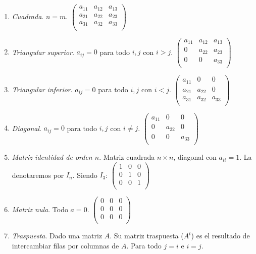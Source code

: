 \documentclass[11pt, oneside, titlepage]{article}
\begin{document}
\begin{enumerate}
\item \emph{Cuadrada}. $n=m$.
$\begin{pmatrix}
	a_{11} & a_{12} & a_{13}\\
	a_{21} & a_{22} & a_{23}\\
	a_{31} & a_{32} & a_{33}\\
\end{pmatrix}$
\item \emph{Triangular superior}. $a_{ij}=0$ para todo $i,j$ con $i > j$.
$\begin{pmatrix}
	a_{11} & a_{12} & a_{13}\\
	0 & a_{22} & a_{23}\\
	0 & 0 & a_{33}\\
\end{pmatrix}$
\item \emph{Triangular inferior}. $a_{ij}=0$ para todo $i,j$ con $i < j$.
$\begin{pmatrix}
	a_{11} & 0 & 0\\
	a_{21} & a_{22} & 0\\
	a_{31} & a_{32} & a_{33}\\
\end{pmatrix}$
\item \emph{Diagonal}. $a_{ij} = 0$ para todo $i,j$ con $i \neq j$.
$\begin{pmatrix}
	a_{11} & 0 & 0\\
	0 & a_{22} & 0\\
	0 & 0 & a_{33}\\
\end{pmatrix}$
\item \emph{Matriz identidad de orden $n$}. Matriz cuadrada $n \times n$, diagonal con $a_{ii} = 1$. La denotaremos por $I_n$. Siendo $I_3$:
$\begin{pmatrix}
	1 & 0 & 0\\
	0 & 1 & 0\\
	0 & 0 & 1\\
\end{pmatrix}$
\item \emph{Matriz nula}. Todo $a = 0$.
$\begin{pmatrix}
	0 & 0 & 0\\
	0 & 0 & 0\\
	0 & 0 & 0\\
\end{pmatrix}$
\item \emph{Traspuesta}. Dado una matriz $A$. Su matriz traspuesta ($A^t$) es el resultado de intercambiar filas por columnas de $A$. Para todo $j=i$ e $i=j$.
\end{enumerate}
\end{document}
